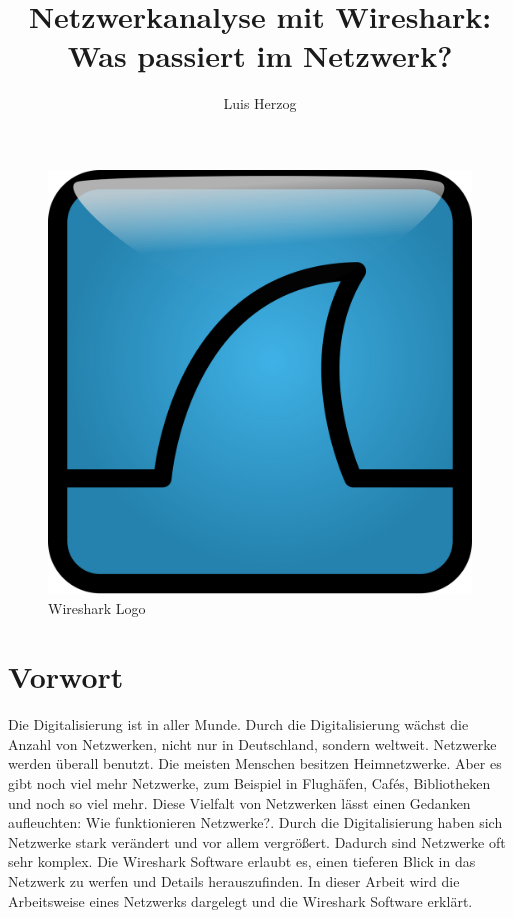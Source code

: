 \documentclass[12pt]{article}
\title{Netzwerkanalyse mit Wireshark: Was passiert im Netzwerk?}
\author{Luis Herzog}
\begin{document}

\maketitle

\begin{figure}[h]
	\centering
	\includegraphics[scale=0.1]{Bilder/Wireshark_icon.svg.png}
	\caption{Wireshark Logo \cite{wireshark-logo}}
	\label{fig:figure1}
\end{figure}

\thispagestyle{empty}
\newpage
\tableofcontents
\thispagestyle{empty}
\newpage

\section{Vorwort}
Die Digitalisierung ist in aller Munde. Durch die Digitalisierung wächst die Anzahl von Netzwerken, nicht nur in Deutschland, sondern weltweit. Netzwerke werden überall benutzt. Die meisten Menschen besitzen Heimnetzwerke. Aber es gibt noch viel mehr Netzwerke, zum Beispiel in Flughäfen, Cafés, Bibliotheken und noch so viel mehr. Diese Vielfalt von Netzwerken lässt einen Gedanken aufleuchten: \glqq Wie funktionieren Netzwerke?\grqq. 
Durch die Digitalisierung haben sich Netzwerke stark verändert und vor allem vergrößert. Dadurch sind Netzwerke oft sehr komplex. Die Wireshark Software erlaubt es, einen tieferen Blick in das Netzwerk zu werfen und Details herauszufinden. In dieser Arbeit wird die Arbeitsweise eines Netzwerks dargelegt und die Wireshark Software erklärt. 
\end{document}
